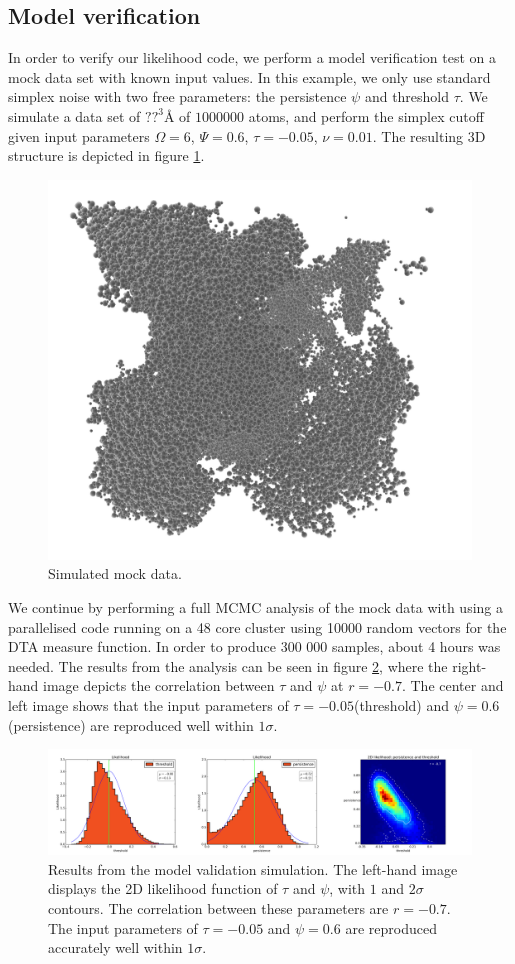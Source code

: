 \documentclass[aps,pre,twocolumn,letterpaper,floatfix,showpacs]{revtex4}
\begin{document}
\subsection{Model verification}
In order to verify our likelihood code, we perform a model verification test on a mock data set with known input values. In this example, we only use standard simplex noise with two free parameters: the persistence $\psi$ and threshold $\tau$. We simulate a data set of $?? ^3 Å$ of $1 000 000$ atoms, and perform the simplex cutoff given input parameters $\Omega=6$, $\Psi = 0.6$, $\tau=-0.05$, $\nu=0.01$. The resulting 3D structure is depicted in figure \ref{fig:mockdata}. 
\begin{figure}
\includegraphics[width=.45\textwidth]{model_test.png}
\caption{Simulated mock data. }
\label{fig:mockdata}
\end{figure}

We continue by performing a full MCMC analysis of the mock data with using a parallelised code running on a 48 core cluster using 10000 random vectors for the DTA measure function. In order to produce 300 000 samples, about 4 hours was needed. The results from the analysis can be seen in figure \ref{fig:mockdataresults}, where the right-hand image depicts the correlation between $\tau$ and $\psi$ at $r=-0.7$. The center and left image shows that the input parameters of $\tau=-0.05$(threshold) and $\psi=0.6$(persistence) are reproduced well within $1 \sigma$.

\begin{figure}
\includegraphics[width=.99\textwidth]{mock_data_results.png}
\caption{Results from the model validation simulation. The left-hand image displays the 2D likelihood function of $\tau$ and $\psi$, with $1$ and $2\sigma$ contours. The correlation between these parameters are $r=-0.7$. The input parameters of $\tau=-0.05$ and $\psi=0.6$ are reproduced accurately well within $1\sigma$. }
\label{fig:mockdataresults}
\end{figure}
\end{document}
